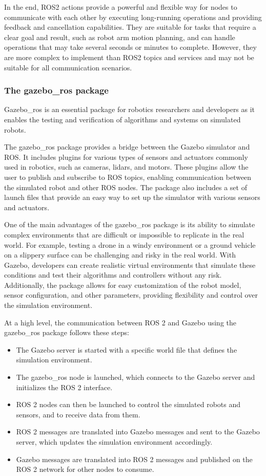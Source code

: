 \documentclass[12pt,oneside]{article}
\begin{document}
In the end, ROS2 actions provide a powerful and flexible way for nodes to communicate with each other by executing long-running operations and providing feedback and cancellation capabilities. They are suitable for tasks that require a clear goal and result, such as robot arm motion planning, and can handle operations that may take several seconds or minutes to complete. However, they are more complex to implement than ROS2 topics and services and may not be suitable for all communication scenarios.

\subsubsection{The gazebo\_ros package}
Gazebo\_ros is an essential package for robotics researchers and developers as it enables the testing and verification of algorithms and systems on simulated robots.

The gazebo\_ros package provides a bridge between the Gazebo simulator and ROS. It includes plugins for various types of sensors and actuators commonly used in robotics, such as cameras, lidars, and motors. These plugins allow the user to publish and subscribe to ROS topics, enabling communication between the simulated robot and other ROS nodes. The package also includes a set of launch files that provide an easy way to set up the simulator with various sensors and actuators.

One of the main advantages of the gazebo\_ros package is its ability to simulate complex environments that are difficult or impossible to replicate in the real world. For example, testing a drone in a windy environment or a ground vehicle on a slippery surface can be challenging and risky in the real world. With Gazebo, developers can create realistic virtual environments that simulate these conditions and test their algorithms and controllers without any risk. Additionally, the package allows for easy customization of the robot model, sensor configuration, and other parameters, providing flexibility and control over the simulation environment.

At a high level, the communication between ROS 2 and Gazebo using the gazebo\_ros package follows these steps:
\begin{itemize}
\item The Gazebo server is started with a specific world file that defines the simulation environment.
\item The gazebo\_ros node is launched, which connects to the Gazebo server and initializes the ROS 2 interface.
\item ROS 2 nodes can then be launched to control the simulated robots and sensors, and to receive data from them.
\item ROS 2 messages are translated into Gazebo messages and sent to the Gazebo server, which updates the simulation environment accordingly.
\item Gazebo messages are translated into ROS 2 messages and published on the ROS 2 network for other nodes to consume.
\end{itemize}
\end{document}
